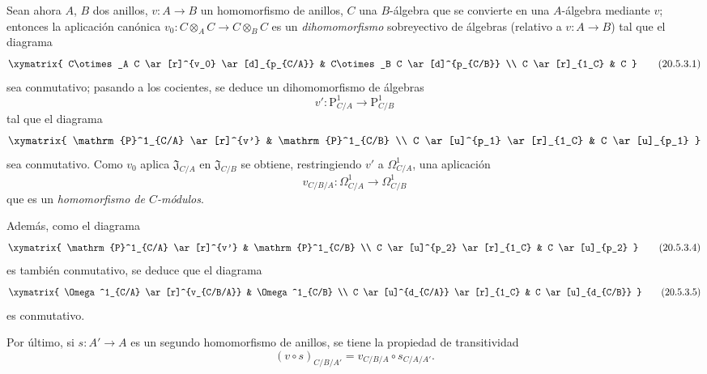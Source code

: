 \begin{env}[20.5.3]
\label{0.20.5.3-fr}
Sean ahora $A$, $B$ dos anillos, $v:A\to B$ un homomorfismo
de anillos, $C$ una $B$-álgebra que se convierte en una $A$-álgebra mediante $v$;
entonces la aplicación canónica $v_0:C\otimes_A C\to C\otimes_B C$ es un
\emph{dihomomorfismo} sobreyectivo de álgebras (relativo a $v:A\to B$) tal que
el diagrama
\[
\xymatrix{
  C\otimes_A C \ar[r]^{v_0} \ar[d]_{p_{C/A}} &
  C\otimes_B C \ar[d]^{p_{C/B}} \\
  C \ar[r]_{1_C} & C
}
\tag{20.5.3.1}
\label{0.20.5.3.1-fr}
\]
sea conmutativo; pasando a los cocientes, se deduce un
dihomomorfismo de álgebras
\begin{equation}
\tag{20.5.3.2}
\label{0.20.5.3.2-fr}
  v':\mathrm{P}^1_{C/A}\to\mathrm{P}^1_{C/B}
\end{equation}
tal que el diagrama
\[
\xymatrix{
  \mathrm{P}^1_{C/A} \ar[r]^{v'} & \mathrm{P}^1_{C/B} \\
  C \ar[u]^{p_1} \ar[r]_{1_C} & C \ar[u]_{p_1}
}
\]
sea conmutativo. Como $v_0$ aplica $\mathfrak{J}_{C/A}$ en
$\mathfrak{J}_{C/B}$ se obtiene, restringiendo $v'$ a
$\Omega^1_{C/A}$, una aplicación
\begin{equation}
\tag{20.5.3.3}
\label{0.20.5.3.3-fr}
  v_{C/B/A}:\Omega^1_{C/A}\to\Omega^1_{C/B}
\end{equation}
que es un \emph{homomorfismo de $C$-módulos}.

Además, como el diagrama
\[
\xymatrix{
  \mathrm{P}^1_{C/A} \ar[r]^{v'} & \mathrm{P}^1_{C/B} \\
  C \ar[u]^{p_2} \ar[r]_{1_C} & C \ar[u]_{p_2}
}
\tag{20.5.3.4}
\label{0.20.5.3.4-fr}
\]
es también conmutativo, se deduce que el diagrama
\[
\xymatrix{
  \Omega^1_{C/A} \ar[r]^{v_{C/B/A}} & \Omega^1_{C/B} \\
  C \ar[u]^{d_{C/A}} \ar[r]_{1_C} & C \ar[u]_{d_{C/B}}
}
\tag{20.5.3.5}
\label{0.20.5.3.5-fr}
\]
es conmutativo.

Por último, si $s:A'\to A$ es un segundo homomorfismo de anillos, se tiene la
propiedad de transitividad
\begin{equation}
\tag{20.5.3.6}
\label{0.20.5.3.6-fr}
  (v\circ s)_{C/B/A'}=v_{C/B/A}\circ s_{C/A/A'}.
\end{equation}
\end{env}

